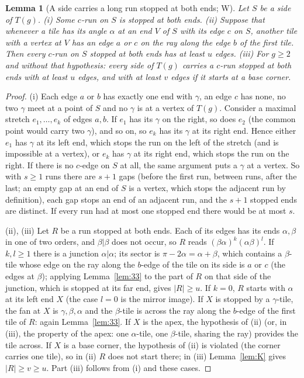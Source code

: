 \documentclass[11pt,reqno]{amsart}
\theoremstyle{plain}
\newtheorem{lemma}[theorem]{Lemma}
\theoremstyle{definition}
\newcommand{\sW}{\textup{\textsf{W}}}
\begin{document}
\begin{lemma}[A side carries a long run stopped at both ends; \sW]\label{lem:34}
Let $S$ be a side of $T(g)$. \textup{(i)} Some $c$-run on $S$ is stopped at both ends. \textup{(ii)} Suppose that whenever a tile has its
angle $\alpha$ at an end $V$ of $S$ with its edge $c$ on $S$, another tile with a vertex at $V$ has an edge $a$ or $c$ on the ray
along the edge $b$ of the first tile. Then every $c$-run on $S$ stopped at both ends has at least $u$ edges. \textup{(iii)} For $g\ge2$ and without that
hypothesis: every side of $T(g)$ carries a $c$-run stopped at both ends with at least $u$ edges, and with at least $v$ edges if it starts at a base corner.
\end{lemma}
\begin{proof}
(i) Each edge $a$ or $b$ has exactly one end with $\gamma$, an edge $c$ has none, no two $\gamma$ meet at a point of $S$ and no $\gamma$ is at a vertex of $T(g)$. Consider a maximal stretch $e_1,\dots,e_k$ of edges $a,b$.
If $e_1$ has its $\gamma$ on the right, so does $e_2$ (the common point would carry two $\gamma$), and so on, so $e_k$ has its $\gamma$ at its right end. Hence either $e_1$ has $\gamma$ at its left end, which stops the run
on the left of the stretch (and is impossible at a vertex), or $e_k$ has $\gamma$ at its right end, which stops the run on the right. If there is no $c$-edge on $S$ at all, the same argument puts a $\gamma$ at a vertex. So with $s\ge1$ runs
there are $s+1$ gaps (before the first run, between runs, after the last; an empty gap at an end of $S$ is a vertex, which stops the adjacent run by definition), each gap stops an end of an adjacent run, and the $s+1$ stopped ends are distinct. If every run had at most one stopped end there would be at most $s$.

(ii), (iii) Let $R$ be a run stopped at both ends. Each of its edges has its ends $\alpha,\beta$ in one of two orders, and $\beta|\beta$ does not occur, so $R$ reads $(\beta\alpha)^k(\alpha\beta)^l$. If $k,l\ge1$ there is a junction $\alpha|\alpha$;
its sector is $\pi-2\alpha=\alpha+\beta$, which contains a $\beta$-tile whose edge on the ray along the $b$-edge of the tile on its side is $a$ or $c$ (the edges at $\beta$); applying Lemma~\ref{lem:33} to the part of $R$ on that side of the junction,
which is stopped at its far end, gives $|R|\ge u$. If $k=0$, $R$ starts with $\alpha$ at its left end $X$ (the case $l=0$ is the mirror image). If $X$ is stopped by a $\gamma$-tile, the fan at $X$ is $\gamma,\beta,\alpha$ and the $\beta$-tile is across the ray along the $b$-edge of the first tile of $R$:
again Lemma~\ref{lem:33}. If $X$ is the apex, the hypothesis of (ii) (or, in (iii), the property of the apex: one $\alpha$-tile, one $\beta$-tile, sharing the ray) provides the tile across. If $X$ is a base corner, the hypothesis of (ii) is violated (the corner carries one tile), so
in (ii) $R$ does not start there; in (iii) Lemma~\ref{lem:K} gives $|R|\ge v\ge u$. Part (iii) follows from (i) and these cases.
\end{proof}
\end{document}
